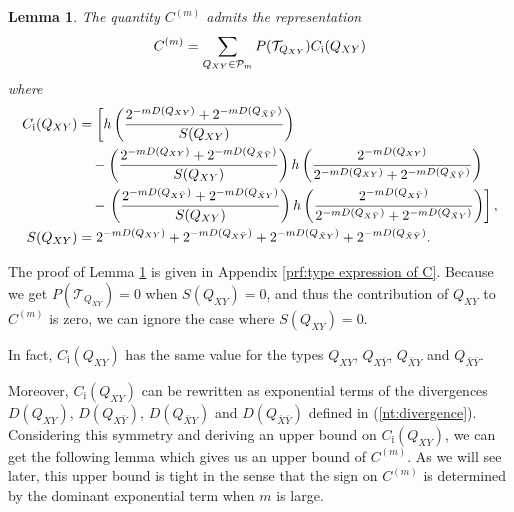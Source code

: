 \documentclass[journal,onecolumn]{IEEEtran}
\newtheorem{lemma}[theorem]{Lemma}
\theoremstyle{definition}
\theoremstyle{remark}
\newcommand{\Dxy}{D({Q_{XY}})}
\newcommand{\Dxby}{D({Q_{X\bar{Y}}})}
\newcommand{\Dbxy}{D({Q_{\bar{X}Y}})}
\newcommand{\Dbxby}{D({Q_{\bar{X}\bar{Y}}})}
\begin{document}
    
    \begin{lemma}\label{lem:type expression of C}
    The quantity $C^{(m)}$ admits the representation
    \begin{equation}\label{eq:type expression of C^{(m)}}
        C^{(m)}=\sum_{Q_{XY} \in \mathcal{P}_m}P(\mathcal{T}_{Q_{XY}})C_{\mathrm{i}}(Q_{XY})
    \end{equation}
    where 
    \begin{align}
        C_\mathrm{i}(Q_{XY}) &= \left[  h\left( \frac{2^{-m\Dxy}+2^{-m\Dbxby}}{S(Q_{XY})} \right)\right.\notag\\
        &\quad -\left(\frac{2^{-m\Dxy}+2^{-m\Dbxby}}{S(Q_{XY})}\right)h\left(\frac{2^{-m\Dxy}}{2^{-m\Dxy}+2^{-m\Dbxby}}\right)\label{eq:C_i} \\ 
        &\quad -\left.\left(\frac{2^{-m\Dxby}+2^{-m\Dbxy}}{S(Q_{XY})}\right)h\left(\frac{2^{-m\Dxby}}{2^{-m\Dxby}+2^{-m\Dbxy}}\right)\right],\notag\\
        S(Q_{XY}) &= 2^{-m \Dxy } + 2^{-m \Dxby } + 2^{-m \Dbxy } + 2^{-m \Dbxby }.\label{eq:S}
    \end{align}

    \end{lemma}
    
    The proof of Lemma \ref{lem:type expression of C} is given in Appendix \ref{prf:type expression of C}.
    Because we get $P(\mathcal{T}_{Q_{XY}})=0$ when $S(Q_{XY})=0$, and thus the contribution of $Q_{XY}$ to $C^{(m)}$ is zero, we can ignore the case where $S(Q_{XY})=0$.

    In fact, $C_{\mathrm{i}}(Q_{XY})$ has the same value for the types $Q_{XY}$, $Q_{X\bar{Y}}$, $Q_{\bar{X}Y}$ and $Q_{\bar{X}\bar{Y}}$.
    

    Moreover, $C_{\mathrm{i}}(Q_{XY})$ can be rewritten as exponential terms of the divergences $\Dxy$, $\Dxby$, $\Dbxy$ and $\Dbxby$ defined in (\ref{nt:divergence}).
    Considering this symmetry and deriving an upper bound on $C_{\mathrm{i}}(Q_{XY})$, we can get the following lemma which gives us an upper bound of $C^{(m)}$.
    As we will see later, this upper bound is tight in the sense that the sign on $C^{(m)}$ is determined by the dominant exponential term when $m$ is large.
\end{document}
